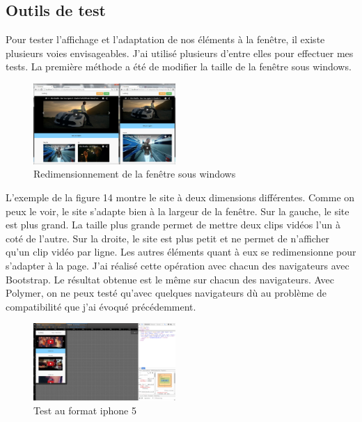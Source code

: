 \documentclass{article}
\begin{document}
\subsection{Outils de test}

\hspace*{0.6cm}Pour tester l'affichage et l'adaptation de nos \'el\'ements \`a la fen\^etre, il existe plusieurs voies envisageables. J'ai utilis\'e plusieurs d'entre elles pour effectuer mes tests. La premi\`ere m\'ethode a \'et\'e de modifier la taille de la fen\^etre sous windows.\\

\begin{figure}
  \vspace{-25pt}
  \begin{center}
    \includegraphics[width=0.48\textwidth]{double}
  \end{center}
  \vspace{-20pt}
  \caption{Redimensionnement de la fen\^etre sous windows}
  \vspace{-10pt}
\end{figure}

L'exemple de la figure 14 montre le site \`a deux dimensions diff\'erentes. Comme on peux le voir, le site s'adapte bien \`a la largeur de la fen\^etre. Sur la gauche, le site est plus grand. La taille plus grande permet de mettre deux clips vid\'eos l'un \`a cot\'e de l'autre. Sur la droite, le site est plus petit et ne permet de n'afficher qu'un clip vid\'eo par ligne. Les autres \'el\'ements quant \`a eux se redimensionne pour s'adapter \`a la page. J'ai r\'ealis\'e cette op\'eration avec chacun des navigateurs avec Bootstrap. Le r\'esultat obtenue est le m\^eme sur chacun des navigateurs. Avec Polymer, on ne peux test\'e qu'avec quelques navigateurs d\`u au probl\`eme de compatibilit\'e que j'ai \'evoqu\'e pr\'ec\'edemment.\\

\begin{figure}
  \vspace{-25pt}
  \begin{center}
    \includegraphics[width=0.48\textwidth]{p16}
  \end{center}
  \vspace{-20pt}
  \caption{Test au format iphone 5}
  \vspace{-10pt}
\end{figure}
\end{document}
